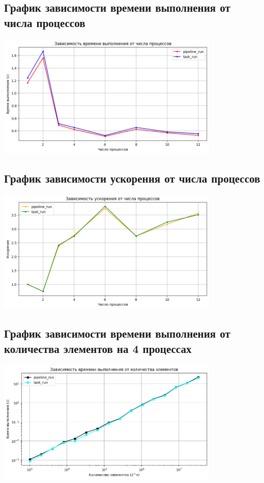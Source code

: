 \documentclass[a4paper,12pt]{article}
\begin{document}
\subsection{График зависимости времени выполнения от числа процессов}
\begin{center}
\includegraphics[width=0.8\textwidth]{images/time num.png}
\end{center}

\subsection{График зависимости ускорения от числа процессов}
\begin{center}
\includegraphics[width=0.8\textwidth]{images/speed num.png}
\end{center}

\subsection{График зависимости времени выполнения от количества элементов на 4 процессах}
\begin{center}
\includegraphics[width=0.8\textwidth]{images/time els four processes.png}
\end{center}
\end{document}
